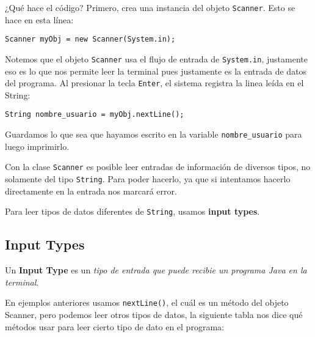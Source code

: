 \documentclass[12pt]{article}
\newcounter{it}
\theoremstyle{largebreak}
\begin{document}
    ¿Qué hace el código? Primero, crea una instancia del objeto \lstinline|Scanner|. Esto se hace en esta línea:
    \begin{center}
        \lstinline|Scanner myObj = new Scanner(System.in);|
    \end{center}
    Notemos que el objeto \lstinline|Scanner| usa el flujo de entrada de \lstinline|System.in|, justamente eso es lo que nos permite leer la terminal pues justamente es la entrada de datos del programa. Al presionar la tecla \texttt{Enter}, el sistema registra la linea leída en el String:
    \begin{center}
        \lstinline|String nombre_usuario = myObj.nextLine();|
    \end{center}
    Guardamos lo que sea que hayamos escrito en la variable \lstinline|nombre_usuario| para luego imprimirlo.

    \begin{obs}
        Con la clase \lstinline|Scanner| es posible leer entradas de información de diversos tipos, no solamente del tipo \lstinline|String|. Para poder hacerlo, ya que si intentamos hacerlo directamente en la entrada nos marcará error.
    \end{obs}

    Para leer tipos de datos diferentes de \lstinline|String|, usamos \textbf{input types}.

    \subsection{Input Types}

    \begin{mydef}
        Un \textbf{Input Type} es un \textit{tipo de entrada que puede recibie un programa Java en la terminal}.
    \end{mydef}

    En ejemplos anteriores usamos \lstinline|nextLine()|, el cuál es un método del objeto Scanner, pero podemos leer otros tipos de datos, la siguiente tabla nos dice qué métodos usar para leer cierto tipo de dato en el programa:
\end{document}
